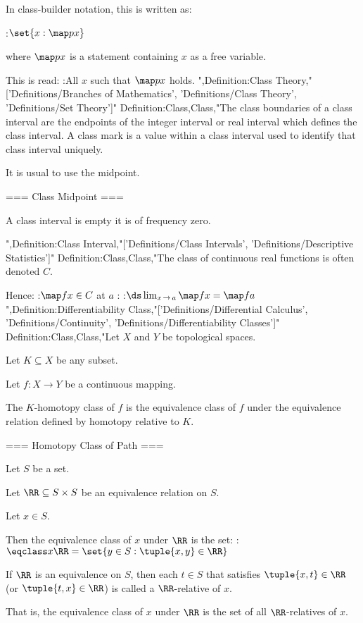 In class-builder notation, this is written as:

:$\set {x: \map p x}$

where $\map p x$ is a statement containing $x$ as a free variable.  

This is read:
:All $x$ such that $\map p x$ holds.
",Definition:Class Theory,"['Definitions/Branches of Mathematics', 'Definitions/Class Theory', 'Definitions/Set Theory']"
Definition:Class,Class,"The class boundaries of a class interval are the endpoints of the integer interval or real interval which defines the class interval.
A class mark is a value within a class interval used to identify that class interval uniquely.

It is usual to use the midpoint.


=== Class Midpoint ===

A class interval is empty  it is of frequency zero.

",Definition:Class Interval,"['Definitions/Class Intervals', 'Definitions/Descriptive Statistics']"
Definition:Class,Class,"The class of continuous real functions is often denoted $C$.

Hence:
:$\map f x \in C$ at $a$
:
:$\ds \lim_{x \mathop \to a} \map f x = \map f a$
",Definition:Differentiability Class,"['Definitions/Differential Calculus', 'Definitions/Continuity', 'Definitions/Differentiability Classes']"
Definition:Class,Class,"Let $X$ and $Y$ be topological spaces.

Let $K \subseteq X$ be any subset.

Let $f : X \to Y$ be a continuous mapping.

The $K$-homotopy class of $f$ is the equivalence class of $f$ under the equivalence relation defined by homotopy relative to $K$.


=== Homotopy Class of Path ===

Let $S$ be a set.

Let $\RR \subseteq S \times S$ be an equivalence relation on $S$.

Let $x \in S$.


Then the equivalence class of $x$ under $\RR$ is the set:
:$\eqclass x \RR = \set {y \in S: \tuple {x, y} \in \RR}$


If $\RR$ is an equivalence on $S$, then each $t \in S$ that satisfies $\tuple {x, t} \in \RR$ (or $\tuple {t, x} \in \RR$) is called a $\RR$-relative of $x$.


That is, the equivalence class of $x$ under $\RR$ is the set of all $\RR$-relatives of $x$.


